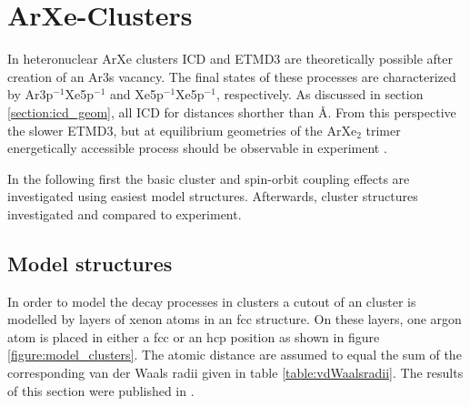 \section{ArXe-Clusters}
In heteronuclear ArXe clusters \ac{ICD} and \ac{ETMD}3 are theoretically
possible after creation of an Ar3s vacancy. The final states of these processes
are characterized by Ar3p$^{-1}$Xe5p$^{-1}$ and Xe5p$^{-1}$Xe5p$^{-1}$,
respectively. As discussed in section \ref{section:icd_geom}, all \ac{ICD}
for distances shorther than \unit[10]{\AA}. From this perspective the
slower \ac{ETMD}3, but at equilibrium geometries
of the ArXe$_2$ trimer energetically accessible process should be
observable in experiment \cite{Fasshauer10}. 

In the following first the basic cluster and spin-orbit coupling effects
are investigated using easiest model
structures. Afterwards, cluster structures investigated and compared to experiment.


\subsection{Model structures}
In order to model the decay processes in clusters a cutout of an cluster
is modelled by layers of xenon atoms in an \ac{fcc} structure. On these
layers, one argon atom is placed in either a \ac{fcc} or an \ac{hcp} position
as shown in figure \ref{figure:model_clusters}. The atomic distance are
assumed to equal the sum of the corresponding van der Waals radii given in
table \ref{table:vdWaalsradii}. The results of this section were published
in \cite{Fasshauer13}.

